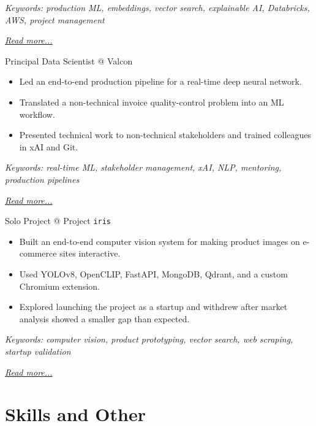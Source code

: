 \documentclass[11pt,a4paper]{moderncv}
\begin{document}
{\footnotesize\textit{Keywords: production ML, embeddings, vector search, explainable AI, Databricks, AWS, project management}}

\hfill{\small{\textit{\hyperref[sec:signum]{Read more...}}}}

\large{Principal Data Scientist @ Valcon}
\normalsize
\begin{itemize}
\item Led an end-to-end production pipeline for a real-time deep neural network.
\item Translated a non-technical invoice quality-control problem into an ML workflow.
\item Presented technical work to non-technical stakeholders and trained colleagues in xAI and Git.
\end{itemize}

{\footnotesize\textit{Keywords: real-time ML, stakeholder management, xAI, NLP, mentoring, production pipelines}}

\hfill{\small{\textit{\hyperref[sec:valcon]{Read more...}}}}

\large{Solo Project @ Project \texttt{iris}}
\normalsize
\begin{itemize}
\item Built an end-to-end computer vision system for making product images on e-commerce sites interactive.
\item Used YOLOv8, OpenCLIP, FastAPI, MongoDB, Qdrant, and a custom Chromium extension.
\item Explored launching the project as a startup and withdrew after market analysis showed a smaller gap than expected.
\end{itemize}

{\footnotesize\textit{Keywords: computer vision, product prototyping, vector search, web scraping, startup validation}}

\hfill{\small{\textit{\hyperref[sec:iris]{Read more...}}}}

\section{Skills and Other}
\normalsize
{}
\end{document}
